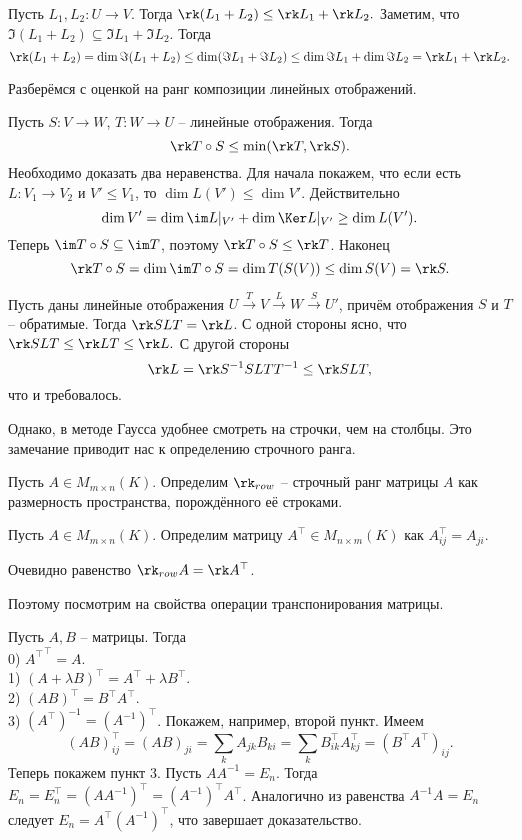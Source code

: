 \utv Пусть $L_1, L_2 \colon U \to V$. Тогда $\rk (L_1 + L_2) \leq \rk L_1 + \rk L_2.$
\eutv
\proof Заметим, что $\Im(L_1 + L_2) \subseteq \Im L_1 + \Im L_2$. Тогда 
$$\rk (L_1 + L_2) =\dim \Im(L_1 + L_2) \leq \dim(\Im L_1 + \Im L_2) \leq \dim\Im L_1 + \dim\Im L_2 = \rk L_1 + \rk L_2.$$
\endproof

Разберёмся с оценкой на ранг композиции линейных отображений.

\utv Пусть $S \colon V \to W$, $T \colon W \to U$ -- линейные отображения. Тогда $$\rk T \circ S \leq \min(\rk T, \rk S).$$
\eutv 
Необходимо доказать два неравенства. Для начала покажем, что если есть $L\colon V_1 \to V_2$ и $V' \leq V_1$, то $\dim L(V') \leq \dim V'$. Действительно $$\dim V'= \dim \im L|_{V'} + \dim \Ker L|_{V'} \geq \dim L(V').$$
Теперь $\im T \circ S \subseteq  \im T$, поэтому $\rk T \circ S \leq \rk T$.
Наконец $$\rk T \circ S= \dim \im T \circ S = \dim T (S(V)) \leq \dim S(V)= \rk S.$$
\endproof


\crl Пусть даны линейные отображения $U \stackrel{T}{\to} V \stackrel{L}{\to} W \stackrel{S}{\to} U'$, причём отображения $S$ и $T$ -- обратимые. Тогда $\rk SLT=\rk L$.
\ecrl
\proof С одной стороны ясно, что $\rk SLT \leq \rk LT \leq \rk L.$ С другой стороны $$\rk L = \rk S^{-1}SLTT^{-1} \leq \rk SLT,$$ что и требовалось.
\endproof







Однако, в методе Гаусса удобнее смотреть на строчки, чем на столбцы. Это замечание приводит нас к определению строчного ранга.

\dfn Пусть $A\in M_{m\times n}(K)$. Определим $\rk_{row}$ -- строчный ранг матрицы $A$ как размерность пространства, порождённого её строками.
\edfn

\dfn Пусть  $A\in M_{m\times n}(K)$. Определим матрицу $A^{\top}\in M_{n\times m}(K)$ как $A^{\top}_{ij}=A_{ji}$.
\edfn

\rm Очевидно равенство $\rk_{row} A= \rk A^{\top}$.
\erm

Поэтому посмотрим на свойства операции транспонирования матрицы.

\lm Пусть $A,B$ -- матрицы. Тогда\\
0) ${A^{\top}}^{\top}=A$.\\
1) $(A+\lambda B)^{\top}= A^{\top}+\lambda B^{\top}$.\\
2) $(AB)^{\top}=B^{\top}A^{\top}$.\\
3) $(A^{\top})^{-1}= (A^{-1})^{\top}$.
\elm
\proof Покажем, например, второй пункт. Имеем
$$(AB)^{\top}_{ij}= (AB)_{ji}=\sum_k A_{jk}B_{ki}=\sum_k B^{\top}_{ik}A^{\top}_{kj}=(B^{\top}A^{\top})_{ij}.$$
Теперь покажем пункт 3. Пусть $AA^{-1}=E_n$. Тогда $E_n=E_n^{\top}=(AA^{-1})^{\top}= (A^{-1})^{\top}A^{\top}$. Аналогично из равенства $A^{-1}A=E_n$ следует $E_n=A^{\top}(A^{-1})^{\top}$, что завершает доказательство.
\endproof

